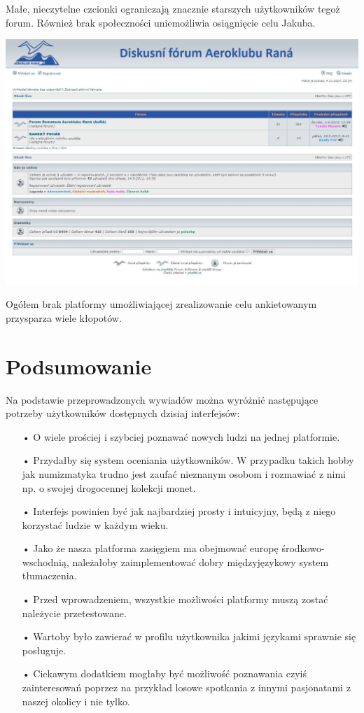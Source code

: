 \documentclass{article}
\begin{document}
\begin{enumerate}
Małe, nieczytelne czcionki ograniczają znacznie starszych użytkowników tegoż forum. Również brak społeczności uniemożliwia osiągnięcie celu Jakuba.
\begin{center}
\includegraphics[width=\textwidth]{7}
\end{center}
\end{enumerate}
Ogółem brak platformy umożliwiającej zrealizowanie celu ankietowanym przysparza wiele kłopotów.
\newpage 
\section{Podsumowanie}
Na podstawie przeprowadzonych wywiadów można wyróżnić następujące potrzeby użytkowników  dostępnych dzisiaj interfejsów:
\begin{itemize}
\item[•]O wiele prościej i szybciej poznawać nowych ludzi na jednej platformie.
\item[•]Przydałby się system oceniania użytkowników. W przypadku takich hobby jak numizmatyka trudno jest zaufać nieznanym osobom i rozmawiać z nimi np. o swojej drogocennej kolekcji monet.
\item[•]Interfejs powinien być jak najbardziej prosty i intuicyjny, będą z niego korzystać ludzie w każdym wieku.
\item[•]Jako że nasza platforma zasięgiem ma obejmować europę środkowo- wschodnią, należałoby zaimplementować dobry międzyjęzykowy system tłumaczenia. 
\item[•]Przed wprowadzeniem, wszystkie możliwości platformy muszą zostać należycie przetestowane.
\item[•]Wartoby było zawierać w profilu użytkownika jakimi językami sprawnie się posługuje.
\item[•]Ciekawym dodatkiem mogłaby być możliwość poznawania czyiś zainteresowań poprzez na przykład losowe spotkania z innymi pasjonatami z naszej okolicy i nie tylko.
\end{itemize}
\end{document}
